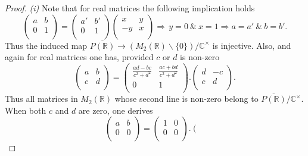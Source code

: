 \documentclass[graybox, envcountsect%
]{svmult}
\def\C{{\mathbb C}}
\def\R{{\mathbb R}}
\begin{document}
\begin{proof} {\it (i)} Note that for real matrices the following implication holds
$$
\left(
\begin{array}{cc}
 a & b \\
 0 & 1 \\
\end{array}
\right)=\left(
\begin{array}{cc}
 a' & b' \\
 0 & 1 \\
\end{array}
\right)\left(
\begin{array}{cc}
 x & y \\
 -y & x \\
\end{array}
\right)\Longrightarrow \, y=0\ \& \ x=1 \Longrightarrow a=a'\ \&\  b=b'.
$$
Thus the induced map $\overline{P(\R)}\to(M_2(\R)\smallsetminus
\{0 \})/\C^\times$ is injective.\newline
Also, and again for real matrices one has, provided $c$ or $d$ is non-zero
\begin{equation}\label{PCdec}
\left(
\begin{array}{cc}
 a & b \\
 c & d \\
\end{array}
\right)=\left(
\begin{array}{cc}
 \frac{a d-b c}{c^2+d^2} & \frac{a c+b d}{c^2+d^2} \\
 0 & 1 \\
\end{array}
\right).\left(
\begin{array}{cc}
 d & -c \\
 c & d \\
\end{array}
\right).
\end{equation}
Thus all matrices in $M_2(\R)$ whose second line is non-zero 
belong to $\overline{P(\R)}/\C^\times$.
When both $c$ and $d$ are zero, one derives 
$$
\left(
\begin{array}{cc}
 a & b \\
 0 & 0 \\
\end{array}
\right)=\left(
\begin{array}{cc}
 1 & 0 \\
 0 & 0 \\
\end{array}
\right).\left(
\begin{array}{cc}

\end{array}$$
\end{proof}
\end{document}
